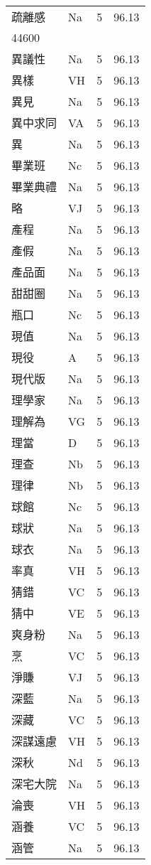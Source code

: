 \documentclass[twocolumn]{book}
\begin{document}
\begin{supertabular}{llrr}
疏離感 & Na & 5 &  96.13\\
44600\\
異議性 & Na & 5 &  96.13\\
異樣 & VH & 5 &  96.13\\
異見 & Na & 5 &  96.13\\
異中求同 & VA & 5 &  96.13\\
異 & Na & 5 &  96.13\\
畢業班 & Nc & 5 &  96.13\\
畢業典禮 & Na & 5 &  96.13\\
略 & VJ & 5 &  96.13\\
產程 & Na & 5 &  96.13\\
產假 & Na & 5 &  96.13\\
產品面 & Na & 5 &  96.13\\
甜甜圈 & Na & 5 &  96.13\\
瓶口 & Nc & 5 &  96.13\\
現值 & Na & 5 &  96.13\\
現役 & A & 5 &  96.13\\
現代版 & Na & 5 &  96.13\\
理學家 & Na & 5 &  96.13\\
理解為 & VG & 5 &  96.13\\
理當 & D & 5 &  96.13\\
理查 & Nb & 5 &  96.13\\
理律 & Nb & 5 &  96.13\\
球館 & Nc & 5 &  96.13\\
球狀 & Na & 5 &  96.13\\
球衣 & Na & 5 &  96.13\\
率真 & VH & 5 &  96.13\\
猜錯 & VC & 5 &  96.13\\
猜中 & VE & 5 &  96.13\\
爽身粉 & Na & 5 &  96.13\\
烹 & VC & 5 &  96.13\\
淨賺 & VJ & 5 &  96.13\\
深藍 & Na & 5 &  96.13\\
深藏 & VC & 5 &  96.13\\
深謀遠慮 & VH & 5 &  96.13\\
深秋 & Nd & 5 &  96.13\\
深宅大院 & Na & 5 &  96.13\\
淪喪 & VH & 5 &  96.13\\
涵養 & VC & 5 &  96.13\\
涵管 & Na & 5 &  96.13\\

\end{supertabular}
\end{document}

